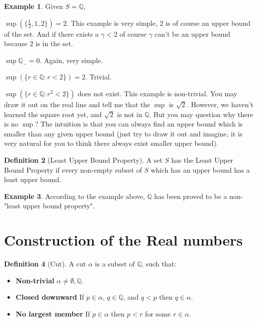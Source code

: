 \documentclass[12pt]{article}
\newcommand{\QQ}{\mathbb{Q}}   %
\theoremstyle{definition}
\newtheorem{definition}{Definition}[section]
\newtheorem{example}[definition]{Example}
\theoremstyle{plain}
\begin{document}
\begin{example}
Given $S = \QQ$,

$\sup(\{\frac{1}{2}, 1, 2\}) = 2$. This example is very simple, $2$ is of course an upper bound of the set. And if there exists a $\gamma < 2$ of course $\gamma$ can't be an upper bound because $2$ is in the set.

$\sup \QQ_- = 0$. Again, very simple.

$\sup(\{r \in \QQ : r <2\}) = 2$. Trivial.

$\sup(\{r \in \QQ : r^2 <2\})$ does not exist. This example is non-trivial. You may draw it out on the real line and tell me that the $\sup$ is $\sqrt{2}$. However, we haven't learned the square root yet, and $\sqrt{2}$ is not in $\QQ$. But you may question why there is no $\sup$? The intuition is that you can always find an upper bound which is smaller than any given upper bound (just try to draw it out and imagine, it is very natural for you to think there always exist smaller upper bound).
\end{example}

\begin{definition}[Least Upper Bound Property]
A set $S$ has the Least Upper Bound Property if every non-empty subset of $S$ which has an upper bound has a least upper bound. 
\end{definition}

\begin{example}
According to the example above, $\QQ$ has been proved to be a non-"least upper bound property".
\end{example}

\section{Construction of the Real numbers}

\begin{definition}[Cut]
A cut $\alpha$ is a subset of $\QQ$, such that:
\begin{itemize}
    \item \textbf{Non-trivial} $\alpha \neq \emptyset, \QQ$.
    \item \textbf{Closed downward} If $p \in \alpha$, $q \in \QQ$, and $q<p$ then $q \in \alpha$.
    \item \textbf{No largest member} If $p \in \alpha$ then $p < r$ for some $r \in \alpha$.
\end{itemize}
\end{definition}
\end{document}
